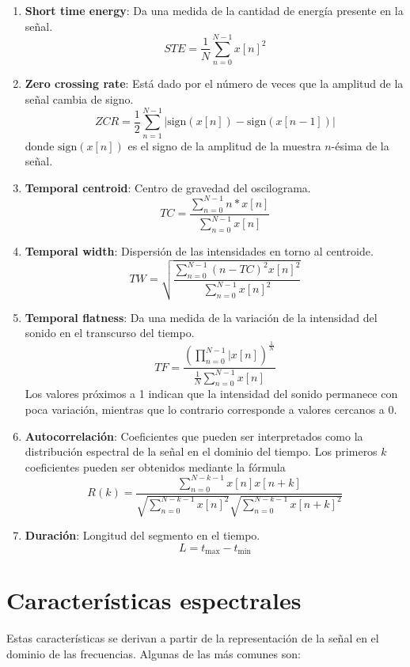 \begin{enumerate}
    \item \textbf{Short time energy}: Da una medida de la cantidad de energía presente en la señal.
    \[
        STE = \frac{1}{N}\sum_{n=0}^{N-1}{x[n]^2}
    \]
    \item \textbf{Zero crossing rate}: Está dado por el número de veces que la amplitud de la señal cambia de signo.
    \[
        ZCR = \frac{1}{2}\sum_{n=1}^{N-1}{|\text{sign}(x[n]) - \text{sign}(x[n-1])|}
    \]
    donde $\text{sign}(x[n])$ es el signo de la amplitud de la muestra $n$-ésima de la señal.
    \item \textbf{Temporal centroid}: Centro de gravedad del oscilograma.
    \[
        TC = \frac{\sum_{n=0}^{N-1}{n*x[n]}}{\sum_{n=0}^{N-1}{x[n]}}
    \]
    \item \textbf{Temporal width}: Dispersión de las intensidades en torno al centroide.
    \[
        TW = \sqrt{\frac{\sum_{n=0}^{N-1}{(n-TC)^2 x[n]^2}}{\sum_{n=0}^{N-1}{x[n]^2}}}
    \]
    \item \textbf{Temporal flatness}: Da una medida de la variación de la intensidad del sonido en el transcurso del tiempo.
    \[
        TF = \frac{(\prod_{n=0}^{N-1}{|x[n]})^{\frac{1}{N}}}{\frac{1}{N}\sum_{n=0}^{N-1}{x[n]}}
    \]
    Los valores próximos a 1 indican que la intensidad del sonido permanece con poca variación, mientras que lo contrario corresponde a valores cercanos a 0.
    \item \textbf{Autocorrelación}: Coeficientes que pueden ser interpretados como la distribución espectral de la señal en el dominio del tiempo.
    Los primeros $k$ coeficientes pueden ser obtenidos mediante la fórmula
    \[
        R(k) = \frac{\sum_{n=0}^{N-k-1}{x[n]x[n+k]}}{\sqrt{\sum_{n=0}^{N-k-1}{x[n]^2}}\sqrt{\sum_{n=0}^{N-k-1}{x[n+k]^2}}}
    \]
    \item \textbf{Duración}: Longitud del segmento en el tiempo.
    \[
        L = t_{\max} - t_{\min}
    \]
\end{enumerate}

\section{Características espectrales}\label{sec:característicasEspectrales}

Estas características se derivan a partir de la representación de la señal en el dominio de las frecuencias.
Algunas de las más comunes son:


